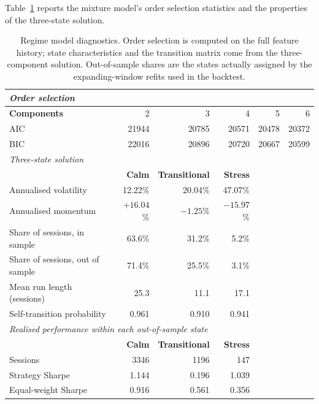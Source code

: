 \documentclass{singlecol-new}
\theoremstyle{TH}{
\newtheorem{lemma}{Lemma}
\newtheorem{theorem}[lemma]{Theorem}
\newtheorem{corrolary}[lemma]{Corrolary}
\newtheorem{conjecture}[lemma]{Conjecture}
\newtheorem{proposition}[lemma]{Proposition}
\newtheorem{claim}[lemma]{Claim}
\newtheorem{stheorem}[lemma]{Wrong Theorem}
\newtheorem{algorithm}{Algorithm}
}
\theoremstyle{THrm}{
\newtheorem{definition}{Definition}[section]
\newtheorem{question}{Question}[section]
\newtheorem{remark}{Remark}
\newtheorem{scheme}{Scheme}
}
\theoremstyle{THhit}{
\newtheorem{case}{Case}[section]
}
\begin{document}
Table~\ref{tab:regimefit} reports the mixture model's order selection statistics and the properties of
the three-state solution.

\begin{table}[!ht]
\centering
\caption{Regime model diagnostics. Order selection is computed on the full feature
history; state characteristics and the transition matrix come from the three-component
solution. Out-of-sample shares are the states actually assigned by the expanding-window
refits used in the backtest.}
\label{tab:regimefit}
\small
\begin{tabular}{p{3.2cm}rrrrr}
\hline
\multicolumn{6}{l}{\textit{Order selection}} \\
\hline
\textbf{Components} & 2 & 3 & 4 & 5 & 6 \\
AIC & 21944 & 20785 & 20571 & 20478 & 20372 \\
BIC & 22016 & 20896 & 20720 & 20667 & 20599 \\
\hline
\multicolumn{6}{l}{\textit{Three-state solution}} \\
\hline
& \textbf{Calm} & \textbf{Transitional} & \textbf{Stress} & & \\
Annualised volatility & 12.22\% & 20.04\% & 47.07\% & & \\
Annualised momentum & $+16.04$\% & $-1.25$\% & $-15.97$\% & & \\
Share of sessions, in sample & 63.6\% & 31.2\% & 5.2\% & & \\
Share of sessions, out of sample & 71.4\% & 25.5\% & 3.1\% & & \\
Mean run length (sessions) & 25.3 & 11.1 & 17.1 & & \\
Self-transition probability & 0.961 & 0.910 & 0.941 & & \\
\hline
\multicolumn{6}{l}{\textit{Realised performance within each out-of-sample state}} \\
\hline
& \textbf{Calm} & \textbf{Transitional} & \textbf{Stress} & & \\
Sessions & 3346 & 1196 & 147 & & \\
Strategy Sharpe & 1.144 & 0.196 & 1.039 & & \\
Equal-weight Sharpe & 0.916 & 0.561 & 0.356 & & \\
\hline
\end{tabular}
\end{table}
\end{document}
